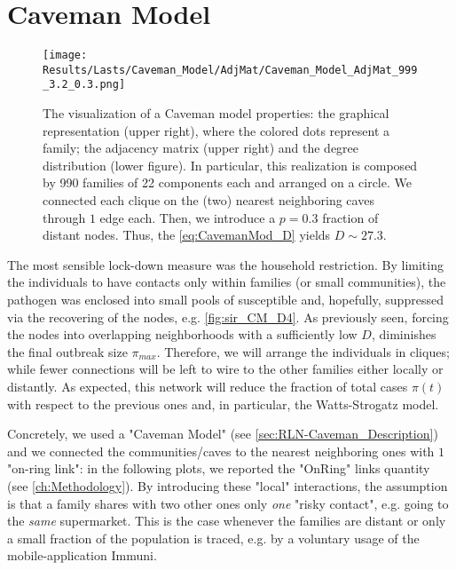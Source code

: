 \documentclass[a4paper,10pt, oneside]{book} %
\theoremstyle{definition}
\begin{document}
\section{Caveman Model}
\label{sec:res_CM}
\begin{figure}[t]
	\centering
	\texttt{[image: Results/Lasts/Caveman\_Model/AdjMat/Caveman\_Model\_AdjMat\_999\_3.2\_0.3.png]}
	\caption{The visualization of a Caveman model properties: the graphical representation (upper right), where the colored dots represent a family; the adjacency matrix (upper right) and the degree distribution (lower figure). In particular, this realization is composed by 990 families of 22 components each and arranged on a circle. We connected each clique on the (two) nearest neighboring caves through $1$ edge each. Then, we introduce a $p = 0.3$ fraction of distant nodes. Thus, the \autoref{eq:CavemanMod_D} yields $D \sim 27.3$.}
	\label{fig:CM_AdjMat_p0.3}
\end{figure}
The most sensible lock-down measure was the household restriction. By limiting the individuals to have contacts only within families (or small communities), the pathogen was enclosed into small pools of susceptible and, hopefully, suppressed via the recovering of the nodes, e.g. \autoref{fig:sir_CM_D4}. As previously seen, forcing the nodes into overlapping neighborhoods with a sufficiently low $ D$, diminishes the final outbreak size $ \pi_{max}$. Therefore, we will arrange the individuals in cliques; while fewer connections will be left to wire to the other families either locally or distantly. As expected, this network will reduce the fraction of total cases $\pi(t)$ with respect to the previous ones and, in particular, the Watts-Strogatz model.

Concretely, we used a "Caveman Model" (see \autoref{sec:RLN-Caveman_Description}) and we connected the communities/caves to the nearest neighboring ones with $ 1$ "on-ring link": in the following plots, we reported the "OnRing" links quantity (see \autoref{ch:Methodology}). By introducing these "local" interactions, the assumption is that a family shares with two other ones only \textit{one} "risky contact", e.g. going to the \textit{same} supermarket. This is the case whenever the families are distant or only a small fraction of the population is traced, e.g. by a voluntary usage of the mobile-application Immuni.
\end{document}
